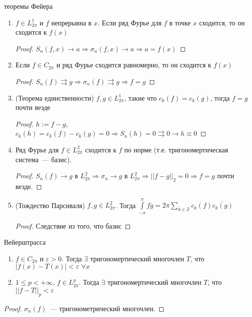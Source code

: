 \begin{consequences}
	теоремы Фейера
	
	\begin{enumerate}
		\item $f \in L_{2\pi}^1$ и $f$ непрерывна в $x$. Если ряд Фурье для $f$ в точке $x$ сходится, то он сходится к $f(x)$
		\begin{proof}
			$S_n(f, x) \rightarrow a \Rightarrow \sigma_n(f, x) \rightarrow a \Rightarrow a = f(x)$
		\end{proof}
		\item Если $f \in C_{2\pi}$ и ряд Фурье сходится равномерно, то он сходится к $f(x)$
		\begin{proof}
			$S_n(f) \rightrightarrows g	\Rightarrow \sigma_n(f) \rightrightarrows g \Rightarrow f = g$
		\end{proof}
		\item (Теорема единственности) $f, g \in L_{2\pi}^1$, такие что $c_k(f) = c_k(g)$, тогда $f = g$ почти везде
		\begin{proof}
			$h := f - g$, $c_k(h) = c_k(f) - c_k(g)	= 0 \Rightarrow S_n(h) = 0 \rightrightarrows 0 \rightarrow h \equiv 0$ 
		\end{proof}
		\item Ряд Фурье для $f \in L_{2\pi}^2$ сходится к $f$ по норме (т.е. тригономертическая система~--- базис).
		\begin{proof}
			$S_n(f) \rightarrow g$ в $L_{2\pi}^2 \Rightarrow \sigma_n \rightarrow g$ в $L_{2\pi}^2 \Rightarrow ||f - g||_2 = 0 \Rightarrow f = g$ почти везде.
		\end{proof}
		\item (Тождество Парсиваля) $f, g \in L_{2\pi}^2$. Тогда $\int\limits_{-\pi}^{\pi} f \overline{g} = 2\pi\sum\limits_{k \in \mathbb{Z}} c_k(f)\overline{c_k(g)}$
		\begin{proof}
			Следствие из того, что базис
		\end{proof}
	\end{enumerate} 
\end{consequences}

\begin{theorem}
	Вейерштрасса
	\begin{enumerate}
		\item $f \in C_{2\pi}$ и $\varepsilon > 0$. Тогда $\exists$ тригономертический многочлен $T$, что $|f(x) - T(x)| < \varepsilon \,\, \forall x$
		\item $1 \leqslant p < +\infty$, $f \in L_{2\pi}^p$. Тогда $\exists$ тригономертический многочлен $T$, что $||f - T||_p < \varepsilon$   
	\end{enumerate}
\end{theorem}
\begin{proof}
	$\sigma_n(f)$~--- тригонометрический многочлен.
\end{proof}

